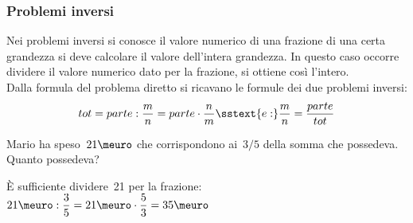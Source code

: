 \subsubsection{Problemi inversi}

Nei problemi inversi si conosce il valore numerico di una frazione di una 
certa grandezza si deve calcolare il valore dell'intera grandezza.
In questo caso occorre dividere il valore numerico dato per la frazione, 
si ottiene così l'intero. \\
Dalla formula del problema diretto si ricavano le 
formule dei due problemi inversi: 
\[tot = parte : \dfrac{m}{n} = parte \cdot \dfrac{n}{m} \sstext{e:}
  \dfrac{m}{n} = \dfrac{parte}{tot}\] 


\begin{esempio}{}{}
Mario ha speso~\(21\meuro\) che corrispondono ai~\(3/5\) della somma 
che possedeva. Quanto possedeva?

È sufficiente dividere~21 per la frazione: \quad 
\(21\meuro : \dfrac{3}{5} = 21\meuro \cdot \dfrac{5}{3}=35\meuro\)
\end{esempio}

